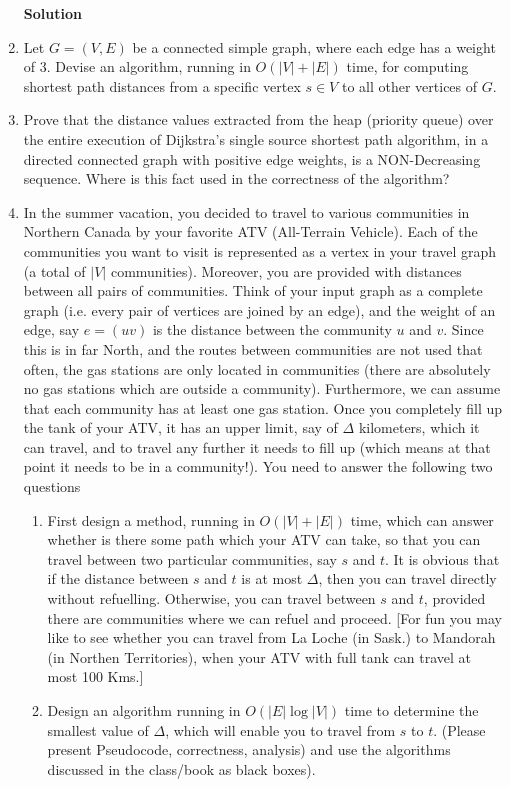 \documentclass[12pt]{article}
\begin{document}
\begin{enumerate}
\color{black}
\textbf{Solution} 

\item Let $G=(V,E)$ be a connected simple graph, where each edge has a weight of $3$. Devise an algorithm, running in $O(|V|+|E|)$ time, for computing shortest path distances from a specific vertex $s\in V$ to all other vertices of $G$. 
\newpage

\item Prove that the distance values extracted from the heap (priority queue) over the entire execution of Dijkstra's single source shortest path algorithm, in a directed connected graph with positive edge weights, is a NON-Decreasing 
sequence.  Where is this fact used in the correctness of the algorithm?

\item In the summer vacation, you decided to travel to various communities in Northern Canada by your favorite ATV (All-Terrain Vehicle).
Each of the communities you want to visit is
represented as a vertex in your travel graph (a total of $|V|$ communities). Moreover, you are provided with distances between  all pairs of  communities. Think of your input graph as a complete graph (i.e. every pair of vertices are joined by an edge), and the weight of an edge, say $e=(uv)$ is the distance
between the community $u$ and $v$. Since this is in far North, and the routes between communities are not used that often, the gas stations 
are only located in communities (there are absolutely no gas stations which are outside a community). Furthermore, we can assume
that each community has at least one gas station. Once you completely fill up the tank of your ATV, it has an upper limit, say of $\Delta$ kilometers, which it can travel, and to travel any further it needs to fill up (which means at that point it needs to be in a community!).
You need to answer the following two questions

\begin{enumerate}
\item First design a method, running in $O(|V|+|E|)$ time, which can answer whether is there some path which your ATV can take, so that 
you can travel between two particular communities, say $s$ and $t$. It is obvious that if the distance between $s$ and $t$ is at most $\Delta$, then you can travel directly without refuelling. Otherwise, you can travel between $s$ and $t$, provided there are communities where we can
refuel and proceed. [For fun you may like to see whether you can travel from La Loche (in Sask.) to Mandorah (in Northen Territories), when your ATV with full tank can travel at most 100 Kms.]

\item Design an algorithm running in $O(|E|\log |V|)$ time to determine the smallest value of $\Delta$, which will enable you to travel from $s$ to $t$. (Please present Pseudocode, correctness, analysis) and use the algorithms discussed in the class/book as black boxes).
\end{enumerate}

\end{enumerate}
\end{document}
